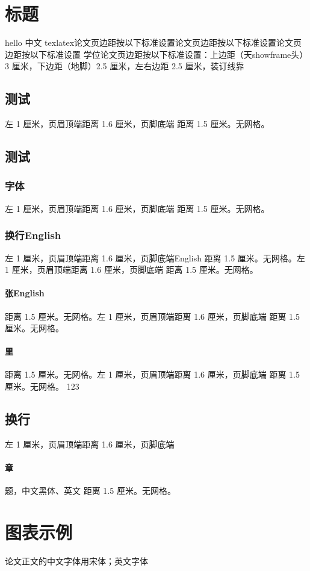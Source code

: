 \documentclass{CQUPTThesis}
\begin{document}
\chapter{标题}
hello 中文 texlatex论文页边距按以下标准设置论文页边距按以下标准设置论文页边距按以下标准设置
学位论文页边距按以下标准设置：上边距（天showframe头）3 厘米，下边距（地脚）2.5
厘米，左右边距 2.5 厘米，装订线靠
\section{测试}
左 1 厘米，页眉顶端距离 1.6 厘米，页脚底端
距离 1.5 厘米。无网格。

\section{测试}
\subsection{字体}
左 1 厘米，页眉顶端距离 1.6 厘米，页脚底端
距离 1.5 厘米。无网格。
\subsection{换行English}
左 1 厘米，页眉顶端距离 1.6 厘米，页脚底端English
距离 1.5 厘米。无网格。左 1 厘米，页眉顶端距离 1.6 厘米，页脚底端
距离 1.5 厘米。无网格。

\subsubsection{张English}
距离 1.5 厘米。无网格。左 1 厘米，页眉顶端距离 1.6 厘米，页脚底端
距离 1.5 厘米。无网格。
\subsubsection{里}
距离 1.5 厘米。无网格。左 1 厘米，页眉顶端距离 1.6 厘米，页脚底端
距离 1.5 厘米。无网格。
123
\section{换行}
左 1 厘米，页眉顶端距离 1.6 厘米，页脚底端
\subsubsection{章}
题，中文黑体、英文
距离 1.5 厘米。无网格。
\chapter{图表示例}
论文正文的中文字体用宋体；英文字体
\end{document}
